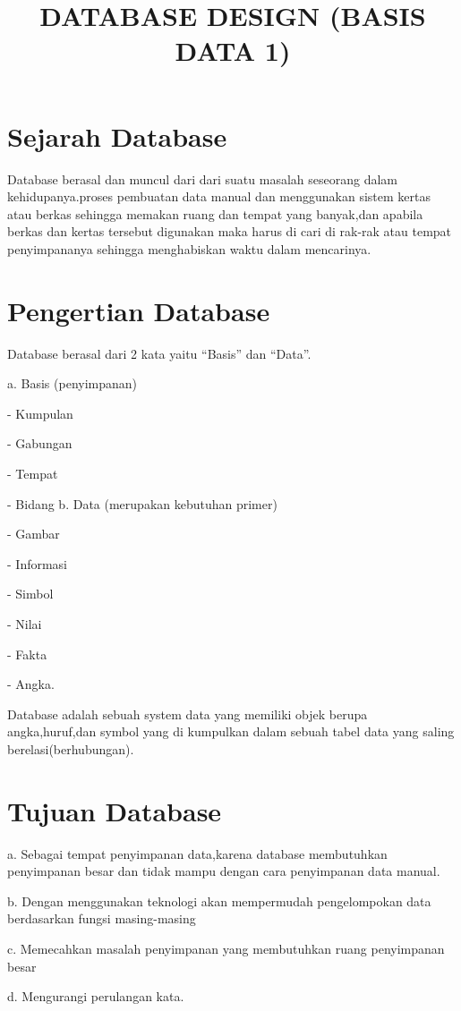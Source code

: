 \documentclass{article}
\title{DATABASE DESIGN (BASIS DATA 1)}
\date{}
\begin{document}
\maketitle
\newpage
\section{Sejarah Database}
Database berasal dan muncul dari dari suatu masalah
seseorang dalam kehidupanya.proses pembuatan data manual dan menggunakan sistem kertas atau berkas sehingga memakan ruang dan tempat yang banyak,dan apabila berkas dan kertas tersebut digunakan maka harus di cari di rak-rak atau tempat penyimpananya sehingga menghabiskan waktu dalam mencarinya.

\section{Pengertian Database}
Database berasal dari 2 kata yaitu “Basis” dan “Data”.
\vspace{0,3cm}
\par a. Basis (penyimpanan)
\par - Kumpulan
\par - Gabungan
\par - Tempat
\par - Bidang
\vspace{0,5cm}
b. Data (merupakan kebutuhan primer)
\par - Gambar
\par - Informasi
\par - Simbol
\par - Nilai
\par - Fakta
\par - Angka.
\vspace{0,3cm}
\par Database adalah sebuah system data yang memiliki objek berupa angka,huruf,dan symbol yang di kumpulkan dalam sebuah tabel data yang saling berelasi(berhubungan).
\section{Tujuan Database}
\par a. Sebagai tempat penyimpanan data,karena database             membutuhkan penyimpanan besar dan tidak mampu dengan         cara penyimpanan data manual.
\par b. Dengan menggunakan teknologi akan mempermudah               pengelompokan data berdasarkan fungsi masing-masing
\par c. Memecahkan masalah penyimpanan yang membutuhkan             ruang penyimpanan besar
\par d. Mengurangi perulangan kata.
\end{document}
